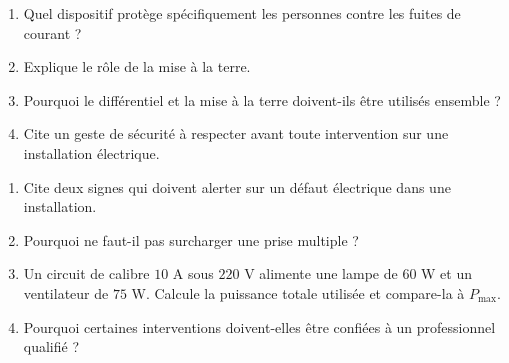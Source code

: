 \begin{enumerate}[label=\arabic*)]
\item Quel dispositif protège spécifiquement les personnes contre les fuites de
courant ?
\item Explique le rôle de la mise à la terre.
\item Pourquoi le différentiel et la mise à la terre doivent-ils être utilisés
ensemble ?
\item Cite un geste de sécurité à respecter avant toute intervention sur une installation
électrique.
\end{enumerate}

\begin{enumerate}[label=\arabic*)]
\item Cite deux signes qui doivent alerter sur un défaut électrique dans une
installation.
\item Pourquoi ne faut-il pas surcharger une prise multiple ?
\item Un circuit de calibre $10$ A sous $220$ V alimente une lampe de $60$ W et un
ventilateur de $75$ W. Calcule la puissance totale utilisée et compare-la à
$P_{\max}$.
\item Pourquoi certaines interventions doivent-elles être confiées à un professionnel
qualifié ?
\end{enumerate}

